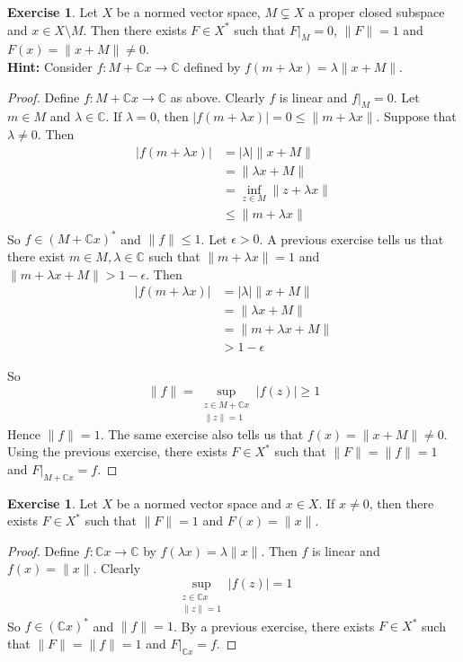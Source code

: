 \documentclass[12pt]{amsart}
\theoremstyle{definition}
\newtheorem{ex}[definition]{Exercise}
\newcommand{\lam}{\lambda}
\newcommand{\ep}{\epsilon}
\newcommand{\C}{\mathbb{C}}
\newcommand{\lex}[1]{\label{ex:#1}}
\begin{document}
	\begin{ex} \lex{}
		Let $X$ be a normed vector space, $M \subsetneq X$ a proper closed subspace and $x \in X \setminus M$. Then there exists $F \in X^*$ such that $F|_M = 0$, $\|F \|=1$ and $ F(x) = \|x+M \|\neq 0$. \\
		\textbf{Hint:} Consider $f:M+\C x \rightarrow \C$ defined by $f(m+\lam x) = \lam \|x +M \|$.
	\end{ex}
	
	\begin{proof}
		Define $f:M+\C x \rightarrow \C$ as above. Clearly $f$ is linear and $f|_M = 0$. Let $m \in M$ and $\lam \in \C$. If $\lam = 0$, then $\vert f(m +\lam x) \vert = 0 \leq \|m+ \lam x \|$. Suppose that $\lam \neq 0$. Then 
		\begin{align*}
			\vert f(m+\lam x) \vert 
			& = \vert \lam \vert \|x+M \|\\
			& =  \|\lam x+M \|\\
			& = \inf_{z \in M} \|z+ \lam x \|\\
			& \leq  \|m+ \lam x  \|\\
		\end{align*} 
		So $f \in (M+\C x )^*$ and $\|f \|\leq 1$. Let $\ep >0$. A previous exercise tells us that there exist $m \in M, \lam \in \C$ such that $\|m+ \lam x \|= 1$ and $\|m+ \lam x +M \|> 1- \ep$. Then 
		\begin{align*}
			\vert f(m + \lam x) \vert
			&= \vert \lam \vert \|x+M\|\\
			&=\|\lam x +M \|\\
			&= \|m + \lam x +M \|\\
			&> 1-\ep
		\end{align*}
		
		So $$ \|f \|= \sup_{\substack{z \in M + \C x \\ \|z \|=1}} \vert f(z) \vert \geq 1$$ Hence $\|f \|=1$. 
		The same exercise also tells us that $f(x) = \|x+M\|\neq 0$. Using the previous exercise, there exists $F \in X^*$ such that $\|F \|= \|f \|= 1$ and $F|_{M+\C x} = f$.
	\end{proof}
	
	\begin{ex} \lex{}
		Let $X$ be a normed vector space and $x \in X$. If $x \neq 0$, then there exists $F \in X^*$ such that $\|F \|= 1$ and $F(x) = \|x \|$.
	\end{ex}
	
	\begin{proof}
		Define $f:\C x \rightarrow \C$ by $f(\lam x) = \lam \|x \|$. Then $f$ is linear and $f(x) = \|x \|$. Clearly $$\sup_{\substack{z \in \C x \\ \|z \|=1}}\vert f(z) \vert = 1$$ 
		So $f \in (\C x)^*$ and $\|f \|= 1$. By a previous exercise, there exists $F \in X^*$ such that $\|F \|= \|f \|=1$ and $F|_{\C x} = f$. 
	\end{proof}
	
\end{document}
